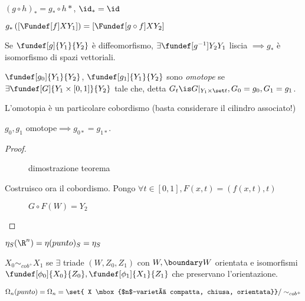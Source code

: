 

\begin{oss}
 $(g\circ h )_* = g_*\circ h*$,
 $\id_* = \id$
\end{oss}
$g_*\left(\left[\Fundef[f]X{Y_1} \right]\right) = \left[\Fundef[g\circ f]X {Y_2} \right]$
\begin{oss}
 Se $\fundef[g]{Y_1}{Y_2}$ è diffeomorfismo, $\exists \fundef[g^{-1}]{Y_2}{Y_1}$ liscia $\implies g_*$ è isomorfismo di spazi vettoriali.
\end{oss}
\begin{defn}[Omotopia]
 $\fundef[g_0]{Y_1}{Y_2}$, $\fundef[g_1]{Y_1}{Y_2}$ sono \emph{omotope} se $\exists \fundef[G]{Y_1\times\left[ 0,1\right]}{Y_2}$ tale che,
 detta $G_t\is  G|_{Y_1\times \set t}, G_0=g_0, G_1=g_1$.
\end{defn}
 \begin{oss}
  L'omotopia è un particolare cobordismo (basta considerare il cilindro associato!)
 \end{oss}
\begin{prop}
 $g_0, g_1$ omotope$\implies g_{0*}=g_{1*}$.
\end{prop}
\begin{proof}
 \begin{figure}
  \centering
  
  \caption{dimostrazione teorema}
 \end{figure}
 Costruisco ora il cobordismo. Pongo $\forall t\in \left[ 0,1\right], F(x,t)=(f(x,t), t)$
  \begin{figure}
  \centering
  
  \caption{$G\circ F (W) = Y_2$}
 \end{figure}

\end{proof}
\begin{oss}
 $\eta_S (\R ^n) = \eta (punto)_S = \eta_S $
\end{oss}


\begin{defn}
 $X_0\sim_{cob^+}X_1$ se $\exists$ triade $(W, Z_0, Z_1)$ con $W, \boundary W$ orientata e isomorfismi $\fundef[\phi_0]{X_0}{Z_0}, \fundef[\phi_1]{X_1}{Z_1}$
 che preservano l'orientazione.
\end{defn}
\begin{defn}
 $\Omega _n(punto)=\Omega _n = \set{ X \mbox{$n$-varietà compatta, chiusa, orientata}} /\sim_{cob^+}$
\end{defn}

